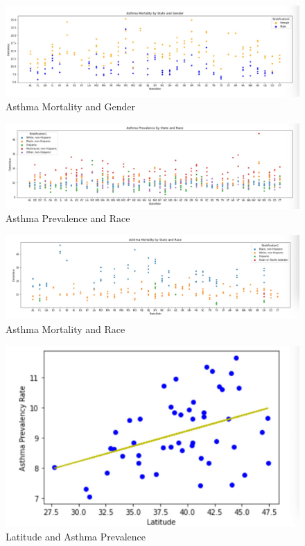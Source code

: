 \documentclass{article}
\begin{document}
\begin{figure}[h]
\centering
\caption{\label{fig:figure22}Asthma Mortality and Gender}
\includegraphics[width=1.0\textwidth]{Asthma Mortality and Gender.png}
\end{figure}

\begin{figure}[h]
\centering
\caption{\label{fig:figure23}Asthma Prevalence and Race}
\includegraphics[width=1.0\textwidth]{Asthma Prevalence and Race.png}
\end{figure}

\begin{figure}[h]
\centering
\caption{\label{fig:figure24}Asthma Mortality and Race}
\includegraphics[width=1.0\textwidth]{Asthma Mortality and Race.png}
\end{figure}

\begin{figure}[h]
\centering
\caption{\label{fig:figure25}Latitude and Asthma Prevalence}
\includegraphics[width=1.0\textwidth]{Latitude and Asthma Prevalence.png}
\end{figure}
\end{document}
